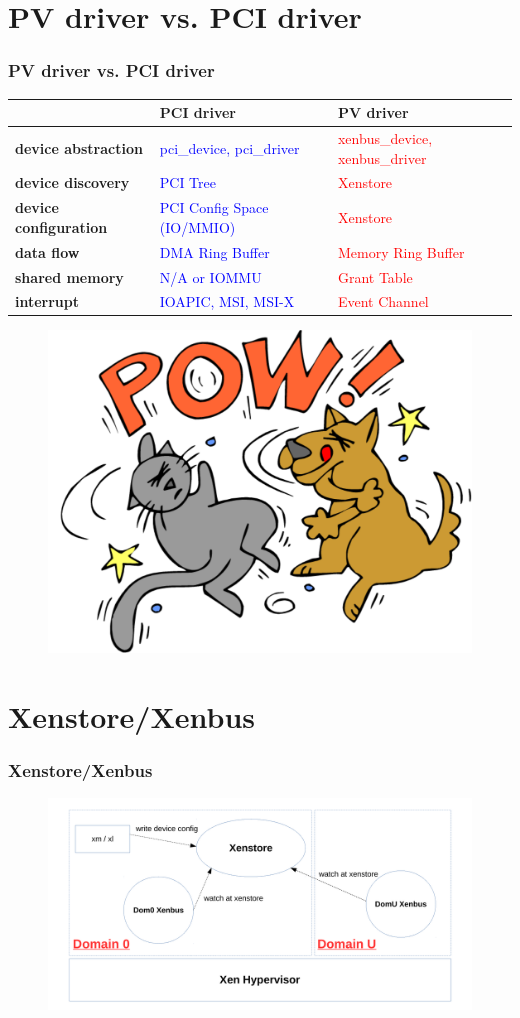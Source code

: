\documentclass[aspectratio=169]{beamer}
\begin{document}
\section{PV driver vs. PCI driver}
\begin{frame}
\frametitle{PV driver vs. PCI driver}
\begin{table}
\begin{tabular}{l l l}
\toprule
& \textbf{PCI driver} & \textbf{PV driver}\\
\midrule
\textbf{device abstraction} & \textcolor{blue}{pci\_device, pci\_driver} & \textcolor{red}{xenbus\_device, xenbus\_driver} \\
\textbf{device discovery} & \textcolor{blue}{PCI Tree} & \textcolor{red}{Xenstore} \\
\textbf{device configuration} & \textcolor{blue}{PCI Config Space (IO/MMIO)} & \textcolor{red}{Xenstore} \\
\textbf{data flow} & \textcolor{blue}{DMA Ring Buffer} & \textcolor{red}{Memory Ring Buffer} \\
\textbf{shared memory} & \textcolor{blue}{N/A or IOMMU} & \textcolor{red}{Grant Table} \\
\textbf{interrupt} & \textcolor{blue}{IOAPIC, MSI, MSI-X} & \textcolor{red}{Event Channel} \\
\bottomrule
\end{tabular}
\end{table}
\begin{figure}
\includegraphics[width=.24\linewidth]{figures/fight.pdf}
\end{figure}
\end{frame}


\section{Xenstore/Xenbus}
\begin{frame}
\frametitle{Xenstore/Xenbus}
\begin{figure}
\includegraphics[width=1.0\linewidth]{figures/xenstore.pdf}
\end{figure}
\end{frame}
\end{document}
